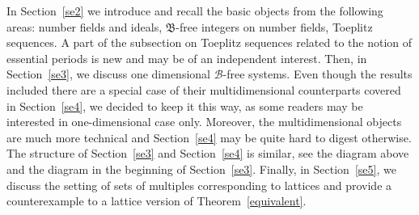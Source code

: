 \documentclass[leqno,a4paper,12pt]{article}
\theoremstyle{definition}
\newcommand{\sB}{\mathscr{B}}
\begin{document}
%
%
In Section~\ref{se2} we introduce and recall the basic objects from the following areas: number fields and ideals, $\mathfrak{B}$-free integers on number fields, Toeplitz sequences. A part of the subsection on Toeplitz sequences related to the notion of essential periods is new and may be of an independent interest. Then, in Section~\ref{se3}, we discuss one dimensional $\sB$-free systems. Even though the results included there are a special case of their multidimensional counterparts covered in Section~\ref{se4}, we decided to keep it this way, as some readers may be interested in one-dimensional case only. Moreover, the multidimensional objects are much more technical and Section~\ref{se4} may be quite hard to digest otherwise. The structure of Section~\ref{se3} and Section~\ref{se4} is similar, see the diagram above and the diagram in the beginning of Section~\ref{se3}. Finally, in Section~\ref{se5}, we discuss the setting of sets of multiples corresponding to lattices and provide a counterexample to a lattice version of Theorem~\ref{equivalent}.
\end{document}
